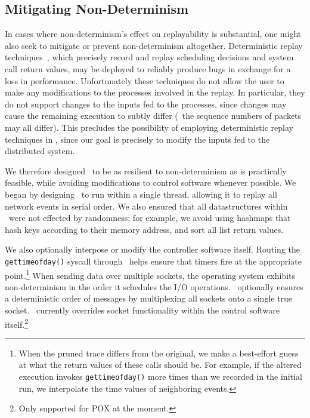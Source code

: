\subsection{Mitigating Non-Determinism}

In cases where non-determinism's effect on replayability is substantial,
one might also seek to mitigate or prevent non-determinism altogether.
Deterministic replay techniques~\cite{Dunlap:2002:REI:844128.844148,Geels:2006:RDD:1267359.1267386},
which precisely record and replay scheduling decisions and system call return values,
may be deployed to reliably produce bugs in exchange for a loss in performance.
Unfortunately these techniques do not allow the user to make any modifications to the processes
involved in the replay. In particular, they do not support changes to the inputs fed to the
processes, since changes may cause the remaining execution to
subtly differ (\eg~the sequence numbers of packets may all differ).
This precludes the possibility of employing deterministic replay techniques in
\projectname, since our goal is precisely to modify the inputs fed to the
distributed system.

We therefore designed \projectname~to be as resilient to non-determinism as is
practically feasible, while avoiding modifications to control software whenever possible.
We began by designing \projectname~to run within a single thread, allowing it
to replay all network events in serial order. We also ensured that all
datastructures within \projectname~were not effected by randomness; for example,
we avoid using hashmaps that hash keys according to their memory address,
and sort all list return values.

We also optionally interpose or modify the controller software itself.
Routing the {\tt gettimeofday()} syscall through \projectname~helps ensure that timers fire
at the appropriate point.\footnote{When the pruned trace differs from the original, we make a
best-effort guess at what the return values of these calls should be. For example,
if the altered execution invokes {\tt gettimeofday()} more times than we recorded
in the initial run, we interpolate the time values of neighboring events.}
When sending data over multiple sockets, the operating system exhibits
non-determinism in the order it schedules the I/O operations.
\projectname~optionally ensures a deterministic order of messages
by multiplexing all sockets
onto a single true socket. \projectname~currently overrides socket functionality within the control
software itself.\footnote{Only supported for POX at the moment.}

